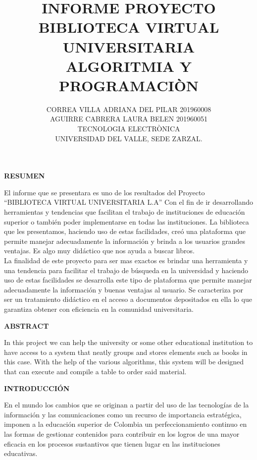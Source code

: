 \documentclass{article}
\begin{document}
\title{INFORME PROYECTO BIBLIOTECA VIRTUAL UNIVERSITARIA \\ ALGORITMIA Y PROGRAMACIÒN}
\author{CORREA VILLA ADRIANA DEL PILAR 201960008 \\ AGUIRRE CABRERA LAURA BELEN 201960051 \\ TECNOLOGIA ELECTRÒNICA \\ UNIVERSIDAD DEL VALLE, SEDE ZARZAL.}
\date{}
\maketitle

\begin{multicols}{2}
\begin{center}
\textbf{RESUMEN} 
\end{center}
El informe que se presentara es uno de los resultados del Proyecto “BIBLIOTECA VIRTUAL UNIVERSITARIA L.A” Con el fin de ir desarrollando herramientas y tendencias que facilitan el trabajo de instituciones de educación superior o también poder implementarse en todas las instituciones. La biblioteca que les presentamos, haciendo uso de estas facilidades, creó una plataforma que permite manejar adecuadamente la información y brinda a los usuarios grandes ventajas. Es algo muy didáctico que nos ayuda a buscar libros. \\
La finalidad de este proyecto para ser mas exactos es brindar una herramienta y una tendencia para facilitar el trabajo de búsqueda en la universidad y haciendo uso de estas facilidades se desarrolla este tipo de plataforma que permite manejar adecuadamente la información y buenas ventajas al usuario. Se caracteriza por ser un tratamiento didáctico en el acceso a documentos depositados en ella lo que garantiza obtener con eficiencia en la comunidad universitaria. \\ 
\begin{center}
\textbf{ABSTRACT} 
\end{center}
In this project we can help the university or some other educational institution to have access to a system that neatly groups and stores elements such as books in this case. With the help of the various algorithms, this system will be designed that can execute and compile a table to order said material. \\
\begin{center}
\textbf{INTRODUCCIÓN} 
\end{center}
En el mundo los cambios que se originan a partir del uso de las tecnologías de la información y las comunicaciones como un recurso de importancia estratégica, imponen a la educación superior de Colombia un perfeccionamiento continuo en las formas de gestionar contenidos para contribuir en los logros de una mayor eficacia en los procesos sustantivos que tienen lugar en las instituciones educativas. \\

\end{multicols}
\end{document}
